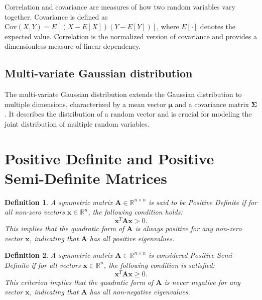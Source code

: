 \documentclass[11pt]{book} %
\newtheorem{definition}{Definition}[section]
\begin{document}
Correlation and covariance are measures of how two random variables vary together. Covariance is defined as \(\text{Cov}(X, Y) = E[(X - E[X])(Y - E[Y])]\), where \(E[\cdot]\) denotes the expected value. Correlation is the normalized version of covariance and provides a dimensionless measure of linear dependency.

\subsection{Multi-variate Gaussian distribution}

The multi-variate Gaussian distribution extends the Gaussian distribution to multiple dimensions, characterized by a mean vector \(\boldsymbol{\mu}\) and a covariance matrix \(\boldsymbol{\Sigma}\). It describes the distribution of a random vector and is crucial for modeling the joint distribution of multiple random variables.


\section{Positive Definite and Positive Semi-Definite Matrices}


\begin{definition}
A symmetric matrix \(\mathbf{A} \in \mathbb{R}^{n \times n}\) is said to be \textit{Positive Definite} if for all non-zero vectors \(\mathbf{x} \in \mathbb{R}^n\), the following condition holds:
\begin{equation}
\mathbf{x}^T \mathbf{A} \mathbf{x} > 0.
\end{equation}
This implies that the quadratic form of \(\mathbf{A}\) is always positive for any non-zero vector \(\mathbf{x}\), indicating that \(\mathbf{A}\) has all positive eigenvalues.
\end{definition}

\begin{definition}
A symmetric matrix \(\mathbf{A} \in \mathbb{R}^{n \times n}\) is considered \textit{Positive Semi-Definite} if for all vectors \(\mathbf{x} \in \mathbb{R}^n\), the following condition is satisfied:
\begin{equation}
\mathbf{x}^T \mathbf{A} \mathbf{x} \geq 0.
\end{equation}
This criterion implies that the quadratic form of \(\mathbf{A}\) is never negative for any vector \(\mathbf{x}\), indicating that \(\mathbf{A}\) has all non-negative eigenvalues.
\end{definition}
\end{document}
